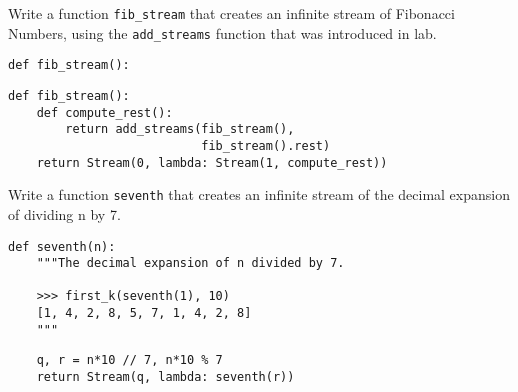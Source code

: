 \question Write a function \texttt{fib\_stream} that creates an infinite
stream of Fibonacci Numbers, using the \texttt{add\_streams} function that was
introduced in lab.

\begin{lstlisting}
def fib_stream():
\end{lstlisting}
\begin{solution}[4cm]
\begin{lstlisting}
def fib_stream():
    def compute_rest():
        return add_streams(fib_stream(),
                           fib_stream().rest)
    return Stream(0, lambda: Stream(1, compute_rest))
\end{lstlisting}
\end{solution}

\question Write a function \texttt{seventh} that creates an infinite
stream of the decimal expansion of dividing n by 7.

\begin{lstlisting}
def seventh(n):
    """The decimal expansion of n divided by 7.

    >>> first_k(seventh(1), 10)
    [1, 4, 2, 8, 5, 7, 1, 4, 2, 8]
    """
\end{lstlisting}
\begin{solution}[3cm]
\begin{lstlisting}
    q, r = n*10 // 7, n*10 % 7
    return Stream(q, lambda: seventh(r))
\end{lstlisting}
\end{solution}

